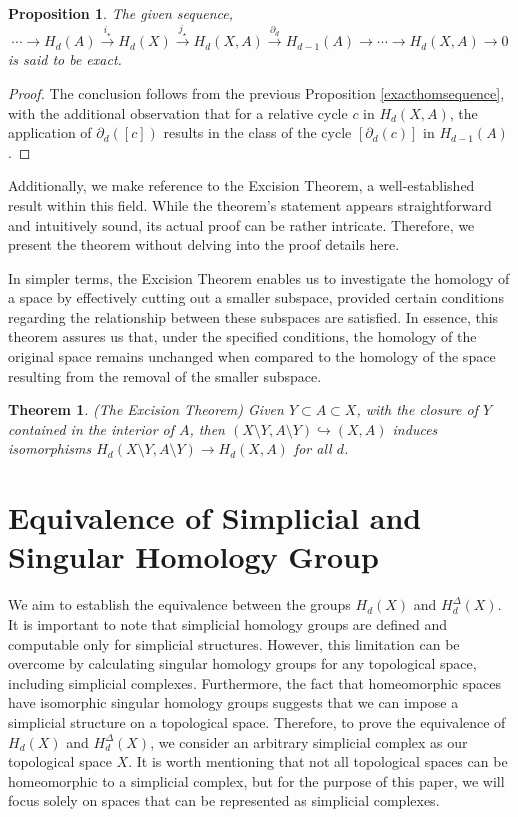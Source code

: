 \documentclass{amsart}
\newtheorem{theorem}[section]{Theorem}
\newtheorem{proposition}[definition]{Proposition}
\begin{document}
\begin{proposition}
The given sequence,
\begin{equation*}
\cdots \rightarrow H_d(A) \xrightarrow{i_\star} H_d(X) \xrightarrow{j_\star} H_d(X,A) \xrightarrow{\partial_d} H_{d-1}(A) \rightarrow \cdots \rightarrow H_d(X,A) \rightarrow 0
\end{equation*}
is said to be exact.
\end{proposition}

\begin{proof}
The conclusion follows from the previous Proposition \ref{exacthomsequence}, with the additional observation that for a relative cycle $c$ in $H_d(X,A)$, the application of $\partial_d([c])$ results in the class of the cycle $[\partial_d(c)]$ in $H_{d-1}(A)$.
\end{proof}

Additionally, we make reference to the Excision Theorem, a well-established result within this field. While the theorem's statement appears straightforward and intuitively sound, its actual proof can be rather intricate. Therefore, we present the theorem without delving into the proof details here.

In simpler terms, the Excision Theorem enables us to investigate the homology of a space by effectively \glqq cutting out\grqq{} a smaller subspace, provided certain conditions regarding the relationship between these subspaces are satisfied. In essence, this theorem assures us that, under the specified conditions, the homology of the original space remains unchanged when compared to the homology of the space resulting from the removal of the smaller subspace.

\begin{theorem}{(The Excision Theorem)}
\label{excisiontheorem}
Given $Y \subset A \subset X$, with the closure of $Y$ contained in the interior of $A$, then $(X\setminus Y, A \setminus Y) \hookrightarrow (X,A)$ induces isomorphisms $H_d(X\setminus Y, A\setminus Y) \rightarrow H_d(X,A)$ for all $d$.
\end{theorem}

\section{Equivalence of Simplicial and Singular Homology Group}
We aim to establish the equivalence between the groups $H_d(X)$ and $H^\Delta_d(X)$. It is important to note that simplicial homology groups are defined and computable only for simplicial structures. However, this limitation can be overcome by calculating singular homology groups for any topological space, including simplicial complexes. Furthermore, the fact that homeomorphic spaces have isomorphic singular homology groups suggests that we can impose a simplicial structure on a topological space. Therefore, to prove the equivalence of $H_d(X)$ and $H^\Delta_d(X)$, we consider an arbitrary simplicial complex as our topological space $X$. It is worth mentioning that not all topological spaces can be homeomorphic to a simplicial complex, but for the purpose of this paper, we will focus solely on spaces that can be represented as simplicial complexes.
\end{document}
